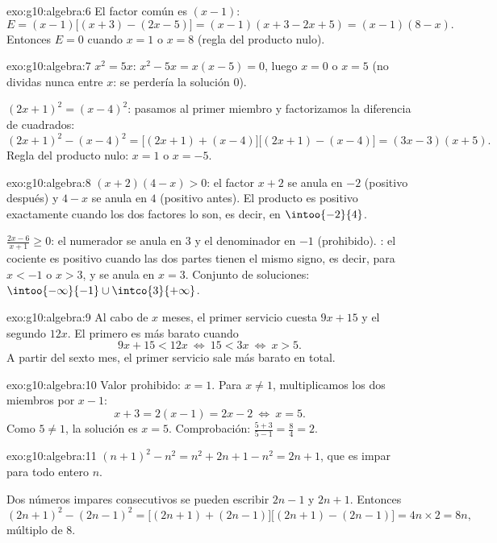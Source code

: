 \begin{solution}{exo:g10:algebra:6}
El factor común es $(x-1)$:
\[
E = (x-1)\bigl[(x+3) - (2x - 5)\bigr] = (x-1)(x + 3 - 2x + 5)
= (x-1)(8 - x).
\]
Entonces $E = 0$ cuando $x = 1$ o $x = 8$ (regla del producto nulo).
\end{solution}

\begin{solution}{exo:g10:algebra:7}
$x^2 = 5x$: $x^2 - 5x = x(x - 5) = 0$, luego $x = 0$ o $x = 5$ (no
dividas nunca entre $x$: se perdería la solución $0$).

$(2x+1)^2 = (x-4)^2$: pasamos al primer miembro y factorizamos la
diferencia de cuadrados:
\[
(2x+1)^2 - (x-4)^2
= \bigl[(2x+1) + (x-4)\bigr]\bigl[(2x+1) - (x-4)\bigr]
= (3x - 3)(x + 5).
\]
Regla del producto nulo: $x = 1$ o $x = -5$.
\end{solution}

\begin{solution}{exo:g10:algebra:8}
$(x+2)(4-x) > 0$: el factor $x + 2$ se anula en $-2$ (positivo después) y
$4 - x$ se anula en $4$ (positivo antes). El producto es positivo
exactamente cuando los dos factores lo son, es decir, en $\intoo{-2}{4}$.

$\frac{2x-6}{x+1} \geq 0$: el numerador se anula en $3$ y el denominador
en $-1$ (prohibido). : el cociente es positivo cuando las
dos partes tienen el mismo signo, es decir, para $x < -1$ o $x > 3$, y se
anula en $x = 3$. Conjunto de soluciones:
$\intoo{-\infty}{-1} \cup \intco{3}{+\infty}$.
\end{solution}

\begin{solution}{exo:g10:algebra:9}
Al cabo de $x$ meses, el primer servicio cuesta $9x + 15$ y el segundo
$12x$. El primero es más barato cuando
\[
9x + 15 < 12x
\ \Longleftrightarrow\
15 < 3x
\ \Longleftrightarrow\
x > 5 .
\]
A partir del sexto mes, el primer servicio sale más barato en total.
\end{solution}

\begin{solution}{exo:g10:algebra:10}
Valor prohibido: $x = 1$. Para $x \neq 1$, multiplicamos los dos miembros
por $x - 1$:
\[
x + 3 = 2(x - 1) = 2x - 2
\ \Longleftrightarrow\
x = 5 .
\]
Como $5 \neq 1$, la solución es $x = 5$. Comprobación:
$\frac{5+3}{5-1} = \frac84 = 2$.
\end{solution}

\begin{solution}{exo:g10:algebra:11}
$(n+1)^2 - n^2 = n^2 + 2n + 1 - n^2 = 2n + 1$, que es impar para todo
entero $n$.

Dos números impares consecutivos se pueden escribir $2n - 1$ y $2n + 1$.
Entonces
\[
(2n+1)^2 - (2n-1)^2
= \bigl[(2n+1)+(2n-1)\bigr]\bigl[(2n+1)-(2n-1)\bigr]
= 4n \times 2 = 8n,
\]
múltiplo de $8$.
\end{solution}

